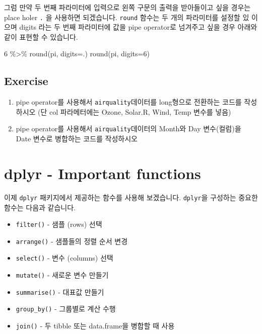 \documentclass[
]{book}
\newenvironment{Shaded}{\begin{snugshade}}{\end{snugshade}}
\newcommand{\AttributeTok}[1]{\textcolor[rgb]{0.77,0.63,0.00}{#1}}
\newcommand{\DecValTok}[1]{\textcolor[rgb]{0.00,0.00,0.81}{#1}}
\newcommand{\FunctionTok}[1]{\textcolor[rgb]{0.00,0.00,0.00}{#1}}
\newcommand{\NormalTok}[1]{#1}
\newcommand{\SpecialCharTok}[1]{\textcolor[rgb]{0.00,0.00,0.00}{#1}}
\providecommand{\tightlist}{%
  \setlength{\itemsep}{0pt}\setlength{\parskip}{0pt}}
\begin{document}
그럼 만약 두 번째 파라미터에 입력으로 왼쪽 구문의 출력을 받아들이고 싶을 경우는 place holer \texttt{.} 을 사용하면 되겠습니다. \texttt{round} 함수는 두 개의 파라미터를 설정할 있 이으며 digits 라는 두 번째 파라미터에 값을 pipe operator로 넘겨주고 싶을 경우 아래와 같이 표현할 수 있습니다.

\begin{Shaded}
\begin{Highlighting}[]
\DecValTok{6} \SpecialCharTok{\%\textgreater{}\%} \FunctionTok{round}\NormalTok{(pi, }\AttributeTok{digits=}\NormalTok{.)}
\FunctionTok{round}\NormalTok{(pi, }\AttributeTok{digits=}\DecValTok{6}\NormalTok{)}
\end{Highlighting}
\end{Shaded}

\hypertarget{ex7.5.1}{%
\subsection{Exercise}\label{ex7.5.1}}

\begin{enumerate}
\def\labelenumi{\arabic{enumi})}
\tightlist
\item
  pipe operator를 사용해서 \texttt{airquality}데이터를 long형으로 전환하는 코드를 작성하시오 (단 col 파라메터에는 Ozone, Solar.R, Wind, Temp 변수를 넣음)\\
\item
  pipe operator를 사용해서 \texttt{airquality}데이터의 Month와 Day 변수(컬럼)을 Date 변수로 병합하는 코드를 작성하시오
\end{enumerate}

\hypertarget{dplyr---important-functions}{%
\section{dplyr - Important functions}\label{dplyr---important-functions}}

이제 \texttt{dplyr} 패키지에서 제공하는 함수를 사용해 보겠습니다. \texttt{dplyr}을 구성하는 중요한 함수는 다음과 같습니다.

\begin{itemize}
\tightlist
\item
  \texttt{filter()} - 샘플 (rows) 선택
\item
  \texttt{arrange()} - 샘플들의 정렬 순서 변경
\item
  \texttt{select()} - 변수 (columns) 선택
\item
  \texttt{mutate()} - 새로운 변수 만들기
\item
  \texttt{summarise()} - 대표값 만들기
\item
  \texttt{group\_by()} - 그룹별로 계산 수행
\item
  \texttt{join()} - 두 tibble 또는 data.frame을 병합할 때 사용
\end{itemize}
\end{document}
